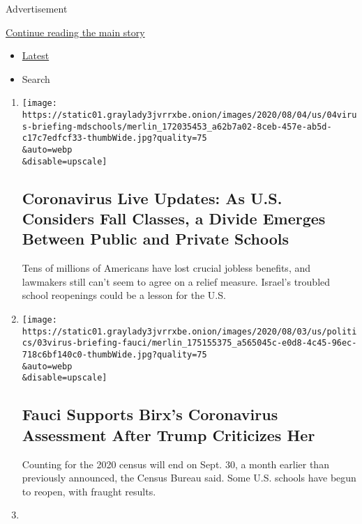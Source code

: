 Advertisement

\protect\hyperlink{after-mid2}{Continue reading the main story}

\begin{itemize}
\tightlist
\item
  \protect\hyperlink{stream-panel}{Latest}
\item
  Search
\end{itemize}

\begin{enumerate}
\def\labelenumi{\arabic{enumi}.}
\item
  \href{/2020/08/04/world/coronavirus-cases.html}{}

  \texttt{[image: https://static01.graylady3jvrrxbe.onion/images/2020/08/04/us/04virus-briefing-mdschools/merlin\_172035453\_a62b7a02-8ceb-457e-ab5d-c17c7edfcf33-thumbWide.jpg?quality=75\\\&auto=webp\\\&disable=upscale]}

  \hypertarget{coronavirus-live-updates-as-us-considers-fall-classes-a-divide-emerges-between-public-and-private-schools-1}{%
  \subsection{Coronavirus Live Updates: As U.S. Considers Fall Classes,
  a Divide Emerges Between Public and Private
  Schools}\label{coronavirus-live-updates-as-us-considers-fall-classes-a-divide-emerges-between-public-and-private-schools-1}}

  Tens of millions of Americans have lost crucial jobless benefits, and
  lawmakers still can't seem to agree on a relief measure. Israel's
  troubled school reopenings could be a lesson for the U.S.
\item
  \href{/2020/08/03/world/coronavirus-covid-19.html}{}

  \texttt{[image: https://static01.graylady3jvrrxbe.onion/images/2020/08/03/us/politics/03virus-briefing-fauci/merlin\_175155375\_a565045c-e0d8-4c45-96ec-718c6bf140c0-thumbWide.jpg?quality=75\\\&auto=webp\\\&disable=upscale]}

  \hypertarget{fauci-supports-birxs-coronavirus-assessment-after-trump-criticizes-her}{%
  \subsection{Fauci Supports Birx's Coronavirus Assessment After Trump
  Criticizes
  Her}\label{fauci-supports-birxs-coronavirus-assessment-after-trump-criticizes-her}}

  Counting for the 2020 census will end on Sept. 30, a month earlier
  than previously announced, the Census Bureau said. Some U.S. schools
  have begun to reopen, with fraught results.
\item
  \href{/2020/08/03/reader-center/coronavirus-medical-bills.html}{}


\end{enumerate}
